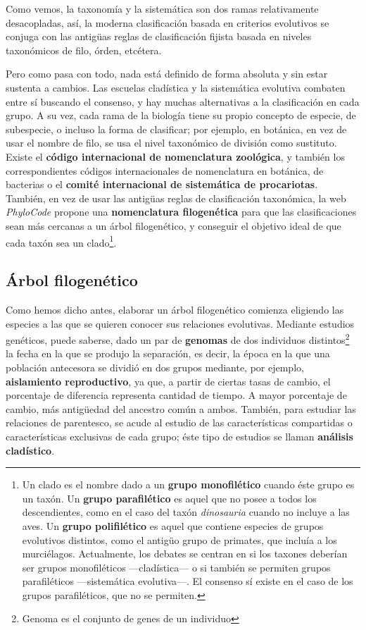 Como vemos, la taxonomía y la sistemática son dos ramas relativamente
desacopladas, así, la moderna clasificación basada en criterios
evolutivos se conjuga con las antigüas reglas de clasificación fijista
basada en niveles taxonómicos de filo, órden, etcétera.

Pero como pasa con todo, nada está definido de forma absoluta y sin
estar sustenta a cambios. Las escuelas cladística y la sistemática
evolutiva combaten entre sí buscando el consenso, y hay muchas
alternativas a la clasificación en cada grupo. A su vez, cada rama de
la biología tiene su propio concepto de especie, de subespecie, o
incluso la forma de clasificar; por ejemplo, en botánica, en vez de
usar el nombre de filo, se usa el nivel taxonómico de división como
sustituto. Existe el \textbf{código internacional de nomenclatura
  zoológica}, y también los correspondientes códigos internacionales
de nomenclatura en botánica, de bacterias o el \textbf{comité
  internacional de sistemática de procariotas}. También, en vez de
usar las antigüas reglas de clasificación taxonómica, la web
\textit{PhyloCode} propone una \textbf{nomenclatura filogenética} para
que las clasificaciones sean más cercanas a un árbol filogenético, y
conseguir el objetivo ideal de que cada taxón sea un clado\footnote{Un
  clado es el nombre dado a un \textbf{grupo monofilético} cuando éste
  grupo es un taxón. Un \textbf{grupo parafilético} es aquel que no
  posee a todos los descendientes, como en el caso del taxón
  \textit{dinosauria} cuando no incluye a las aves. Un \textbf{grupo
    polifilético} es aquel que contiene especies de grupos evolutivos
  distintos, como el antigüo grupo de primates, que incluía a los
  murciélagos. Actualmente, los debates se centran en si los taxones
  deberían ser grupos monofiléticos \----cladística\---- o si
  también se permiten grupos parafiléticos \----sistemática
  evolutiva\----. El consenso sí existe en el caso de los grupos
  parafiléticos, que no se permiten.}.

\subsection{Árbol filogenético}
Como hemos dicho antes, elaborar un árbol filogenético comienza
eligiendo las especies a las que se quieren conocer sus relaciones
evolutivas. Mediante estudios genéticos, puede saberse, dado un par de
\textbf{genomas} de dos individuos distintos\footnote{Genoma es el
  conjunto de genes de un individuo} la fecha en la que se produjo la
separación, es decir, la época en la que una población antecesora se
dividió en dos grupos mediante, por ejemplo, \textbf{aislamiento
  reproductivo}, ya que, a partir de ciertas tasas de cambio, el
porcentaje de diferencia representa cantidad de tiempo. A mayor
porcentaje de cambio, más antigüedad del ancestro común a
ambos. También, para estudiar las relaciones de parentesco, se acude
al estudio de las características compartidas o características
exclusivas de cada grupo; éste tipo de estudios se llaman
\textbf{análisis cladístico}.

